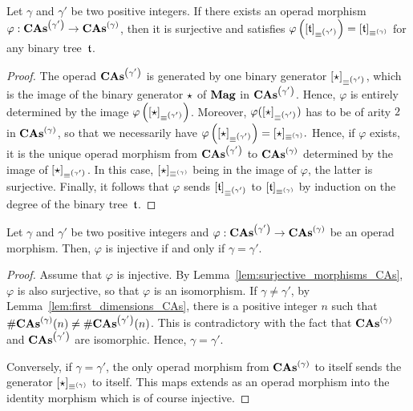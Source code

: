 \begin{Lemma} \label{lem:surjective_morphisms_CAs}
    Let $\gamma$ and $\gamma'$ be two positive integers. If there exists
    an operad morphism $\varphi:\mathbf{CAs}^{\left(\gamma'\right)} \to \mathbf{CAs}^{\left(\gamma\right)}$, then it
    is surjective and satisfies
    \begin{math}
        \varphi\left(\left[\mathfrak{t}\right]_{\operatorname{\equiv}^{\left(\gamma'\right)}}\right)
        = \left[\mathfrak{t}\right]_{\operatorname{\equiv}^{\left(\gamma\right)}}
    \end{math}
    for any binary tree~$\mathfrak{t}$.
\end{Lemma}
\begin{proof}
    The operad $\mathbf{CAs}^{\left(\gamma'\right)}$ is generated by one binary generator
    $[\operatorname{\star}]_{\operatorname{\equiv}^{\left(\gamma'\right)}}$, which is the image of the binary
    generator $\operatorname{\star}$ of $\mathbf{Mag}$ in $\mathbf{CAs}^{\left(\gamma'\right)}$. Hence, $\varphi$
    is entirely determined by the image
    $\varphi\left([\operatorname{\star}]_{\operatorname{\equiv}^{\left(\gamma'\right)}}\right)$. Moreover,
    $\varphi([\operatorname{\star}]_{\operatorname{\equiv}^{\left(\gamma'\right)}})$ has to be of arity $2$ in
    $\mathbf{CAs}^{\left(\gamma\right)}$, so that we necessarily have
    \begin{math}
        \varphi\left([\operatorname{\star}]_{\operatorname{\equiv}^{\left(\gamma'\right)}}\right)
        =
        [\operatorname{\star}]_{\operatorname{\equiv}^{\left(\gamma\right)}}.
    \end{math}
    Hence, if $\varphi$ exists, it is the unique operad morphism from
    $\mathbf{CAs}^{\left(\gamma'\right)}$ to $\mathbf{CAs}^{\left(\gamma\right)}$ determined by the image of
    $[\operatorname{\star}]_{\operatorname{\equiv}^{\left(\gamma'\right)}}$. In this case,
    $[\operatorname{\star}]_{\operatorname{\equiv}^{\left(\gamma\right)}}$ being in the image of $\varphi$,
    the latter is surjective. Finally, it follows that $\varphi$ sends
    $\left[\mathfrak{t}\right]_{\operatorname{\equiv}^{\left(\gamma'\right)}}$ to
    $\left[\mathfrak{t}\right]_{\operatorname{\equiv}^{\left(\gamma\right)}}$ by induction on the degree
    of the binary tree~$\mathfrak{t}$.
\end{proof}
\medbreak

\begin{Lemma} \label{lem:injective_morphisms_CAs}
    Let $\gamma$ and $\gamma'$ be two positive integers and
    $\varphi:\mathbf{CAs}^{\left(\gamma'\right)} \to \mathbf{CAs}^{\left(\gamma\right)}$ be an operad morphism.
    Then, $\varphi$ is injective if and only if $\gamma = \gamma'$.
\end{Lemma}
\begin{proof}
    Assume that $\varphi$ is injective. By
    Lemma~\ref{lem:surjective_morphisms_CAs}, $\varphi$ is also
    surjective, so that $\varphi$ is an isomorphism. If
    $\gamma \ne \gamma'$, by Lemma~\ref{lem:first_dimensions_CAs}, there
    is a positive integer $n$ such that
    $\# \mathbf{CAs}^{\left(\gamma\right)}(n) \ne \# \mathbf{CAs}^{\left(\gamma'\right)}(n)$. This is contradictory
    with the fact that $\mathbf{CAs}^{\left(\gamma\right)}$ and $\mathbf{CAs}^{\left(\gamma'\right)}$ are
    isomorphic. Hence, $\gamma = \gamma'$.
    \smallbreak

    Conversely, if $\gamma = \gamma'$, the only operad morphism from
    $\mathbf{CAs}^{\left(\gamma\right)}$ to itself sends the generator
    $[\operatorname{\star}]_{\operatorname{\equiv}^{\left(\gamma\right)}}$ to itself. This maps extends as
    an operad morphism into the identity morphism which is of course
    injective.
\end{proof}
\medbreak

